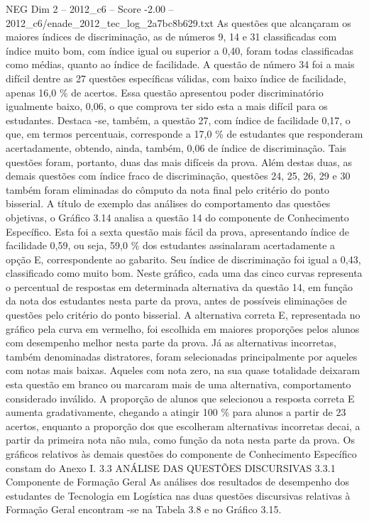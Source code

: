 \begin{textsample}{NEG Dim 2 – 2012\_c6 – Score -2.00 – 2012\_c6/enade\_2012\_tec\_log\_2a7bc8b629.txt}
As questões que alcançaram os maiores índices de discriminação, as de números 9, 14 e 31 classificadas com índice muito bom, com índice igual ou superior a 0,40, foram todas classificadas como médias, quanto ao índice de facilidade.
A questão de número 34 foi a mais difícil dentre as 27 questões específicas válidas, com baixo índice de facilidade, apenas 16,0 \% de acertos.
Essa questão apresentou poder discriminatório igualmente baixo, 0,06, o que comprova ter sido esta a mais difícil para os estudantes.
Destaca -se, também, a questão 27, com índice de facilidade 0,17, o que, em termos percentuais, corresponde a 17,0 \% de estudantes que responderam acertadamente, obtendo, ainda, também, 0,06 de índice de discriminação.
Tais questões foram, portanto, duas das mais difíceis da prova.
Além destas duas, as demais questões com índice fraco de discriminação, questões 24, 25, 26, 29 e 30 também foram eliminadas do cômputo da nota final pelo critério do ponto bisserial.
A título de exemplo das análises do comportamento das questões objetivas, o Gráfico 3.14 analisa a questão 14 do componente de Conhecimento Específico.
Esta foi a sexta questão mais fácil da prova, apresentando índice de facilidade 0,59, ou seja, 59,0 \% dos estudantes assinalaram acertadamente a opção E, correspondente ao gabarito.
Seu índice de discriminação foi igual a 0,43, classificado como muito bom.
Neste gráfico, cada uma das cinco curvas representa o percentual de respostas em determinada alternativa da questão 14, em função da nota dos estudantes nesta parte da prova, antes de possíveis eliminações de questões pelo critério do ponto bisserial.
A alternativa correta E, representada no gráfico pela curva em vermelho, foi escolhida em maiores proporções pelos alunos com desempenho melhor nesta parte da prova.
Já as alternativas incorretas, também denominadas distratores, foram selecionadas principalmente por aqueles com notas mais baixas.
Aqueles com nota zero, na sua quase totalidade deixaram esta questão em branco ou marcaram mais de uma alternativa, comportamento considerado inválido.
A proporção de alunos que selecionou a resposta correta E aumenta gradativamente, chegando a atingir 100 \% para alunos a partir de 23 acertos, enquanto a proporção dos que escolheram alternativas incorretas decai, a partir da primeira nota não nula, como função da nota nesta parte da prova.
Os gráficos relativos às demais questões do componente de Conhecimento Específico constam do Anexo I. 3.3 ANÁLISE DAS QUESTÕES DISCURSIVAS 3.3.1 Componente de Formação Geral As análises dos resultados de desempenho dos estudantes de Tecnologia em Logística nas duas questões discursivas relativas à Formação Geral encontram -se na Tabela 3.8 e no Gráfico 3.15.

\end{textsample}
